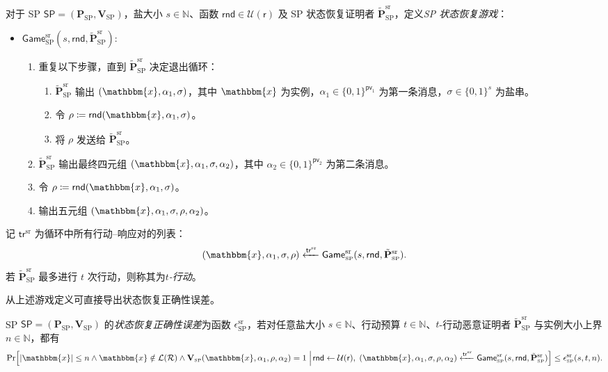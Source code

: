 \documentclass[american,singlepageview]{snargs-book-zh}
\newcommand{\Bits}{\{0,1\}}
\newcommand{\Malicious}[1]{\tilde{#1}}
\newcommand{\DefineEqual}{\coloneqq}
\newcommand{\SomeSize}[1]{|#1|}
\newcommand{\Naturals}{\mathbb{N}}
\newcommand{\Relation}{\mathcal{R}}
\newcommand{\Language}{\mathcal{L}}
\newcommand{\GetLanguage}[1]{\Language(#1)}
\newcommand{\Instance}{\mathbbm{x}}
\newcommand{\InstanceSize}{n}
\newcommand{\ProtoProver}{P}
\newcommand{\ProtoVerifier}{V}
\newcommand{\ProtoSoundnessError}{\epsilon}
\newcommand{\ProtoRandomnessComplexity}{\mathsf{r}}
\newcommand{\ProtoPToVComplexity}{\mathsf{pv}}
\newcommand{\SRSuperscript}{\mathrm{sr}}
\newcommand{\ProtoSRSoundnessError}{\ProtoSoundnessError^{\SRSuperscript}}
\newcommand{\SPSymbol}{\mathsf{SP}}
\newcommand{\SPSubscript}{\scriptscriptstyle\mathrm{SP}}
\newcommand{\SPFormat}[1]{\mathbf{#1}}
\newcommand{\SPProver}{\SPFormat{\ProtoProver}_{\SPSubscript}}
\newcommand{\SPVerifier}{\SPFormat{\ProtoVerifier}_{\SPSubscript}}
\newcommand{\SPMaliciousProver}{\Malicious{\SPFormat{\ProtoProver}}_{\SPSubscript}}
\newcommand{\SPSystem}{(\SPProver,\SPVerifier)}
\newcommand{\SPCommitment}{\alpha_{1}}
\newcommand{\SPChallenge}{\rho}
\newcommand{\SPResponse}{\alpha_{2}}
\newcommand{\SPPToVComplexity}{\ProtoPToVComplexity}
\newcommand{\SPRandomnessComplexity}{\ProtoRandomnessComplexity}
\newcommand{\RODistribution}[1]{\mathcal{U}(#1)}
\newcommand{\ROTrace}{\mathsf{tr}}
\newcommand{\SRBudget}{t}
\newcommand{\SRSaltSize}{s}
\newcommand{\SRSaltString}{\sigma}
\newcommand{\SRRandomness}{\mathsf{rnd}}
\newcommand{\SRTrace}{\ROTrace^{\SRSuperscript}}
\newcommand{\SRGameName}[1]{\mathsf{Game}_{#1}^{\SRSuperscript}}
\newcommand{\SPStateRestorationGame}[3]{\SRGameName{\SPSubscript}(#1,#2,#3)}
\newcommand{\SPSRSoundnessError}{\ProtoSRSoundnessError_{\SPSubscript}}
\newcommand{\SPMaliciousSRProver}{\SPMaliciousProver^{\SRSuperscript}}
\begin{document}
\begin{definition}
\label{definition:sp-state-restoration-game}
对于 SP $\SPSymbol=\SPSystem$，盐大小 $\SRSaltSize\in\Naturals$、函数 $\SRRandomness\in\RODistribution{\SPRandomnessComplexity}$ 及 SP 状态恢复证明者 $\SPMaliciousSRProver$，定义\emph{SP 状态恢复游戏}：
\begin{itemize}[noitemsep]
\item[] \(\SPStateRestorationGame{\SRSaltSize}{\SRRandomness}{\SPMaliciousSRProver}\):
\begin{enumerate}[nolistsep]
  \item 重复以下步骤，直到 $\SPMaliciousSRProver$ 决定退出循环：
  \begin{enumerate}[noitemsep]
    \item $\SPMaliciousSRProver$ 输出 $(\Instance,\SPCommitment,\SRSaltString)$，其中 $\Instance$ 为实例，$\SPCommitment\in\Bits^{\SPPToVComplexity_{1}}$ 为第一条消息，$\SRSaltString\in\Bits^{\SRSaltSize}$ 为盐串。
    \item 令
      \(\SPChallenge\DefineEqual \SRRandomness(\Instance,\SPCommitment,\SRSaltString)\)。
    \item 将 $\SPChallenge$ 发送给 $\SPMaliciousSRProver$。
  \end{enumerate}
  \item $\SPMaliciousSRProver$ 输出最终四元组
    \((\Instance,\SPCommitment,\SRSaltString,\SPResponse)\)，其中 $\SPResponse\in\Bits^{\SPPToVComplexity_{2}}$ 为第二条消息。
  \item 令
    \(\SPChallenge\DefineEqual \SRRandomness(\Instance,\SPCommitment,\SRSaltString)\)。
  \item 输出五元组
    \((\Instance,\SPCommitment,\SRSaltString,\SPChallenge,\SPResponse)\)。
\end{enumerate}
\end{itemize}
记 \(\SRTrace\) 为循环中所有行动–响应对的列表：
\[
  (\Instance,\SPCommitment,\SRSaltString,\SPChallenge)
  \xleftarrow{\SRTrace}
  \SPStateRestorationGame{\SRSaltSize}{\SRRandomness}{\SPMaliciousSRProver}.
\]
若 $\SPMaliciousSRProver$ 最多进行 $\SRBudget$ 次行动，则称其为\emph{$\SRBudget$-行动}。
\end{definition}

从上述游戏定义可直接导出状态恢复正确性误差。

\begin{definition}
\label{definition:sp-state-restoration-soundness}
SP $\SPSymbol=\SPSystem$ 的\emph{状态恢复正确性误差}为函数 $\SPSRSoundnessError$，若对任意盐大小 $\SRSaltSize\in\Naturals$、行动预算 $\SRBudget\in\Naturals$、$\SRBudget$-行动恶意证明者 $\SPMaliciousSRProver$ 与实例大小上界 $\InstanceSize\in\Naturals$，都有
\[
\Pr\Bigl[
  \SomeSize{\Instance}\le\InstanceSize
  \wedge \Instance\notin\GetLanguage{\Relation}
  \wedge \SPVerifier(\Instance,\SPCommitment,\SPChallenge,\SPResponse)=1
\Bigm|\!
  \SRRandomness\gets\RODistribution{\SPRandomnessComplexity},\;
  (\Instance,\SPCommitment,\SRSaltString,\SPChallenge,\SPResponse)\xleftarrow{\SRTrace}\SPStateRestorationGame{\SRSaltSize}{\SRRandomness}{\SPMaliciousSRProver}
\Bigr]
\le
\SPSRSoundnessError(\SRSaltSize,\SRBudget,\InstanceSize).
\]
\end{definition}
\end{document}

